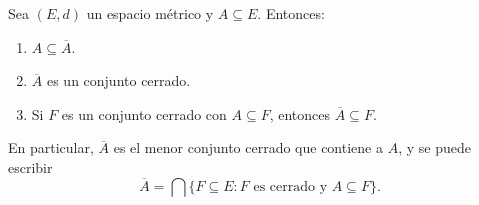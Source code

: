 \begin{prop}
Sea $(E,d)$ un espacio métrico y $A \subseteq E$.
Entonces:
\begin{enumerate}[label=(\roman*)]
    \item $A \subseteq \overline{A}$.
    \item $\overline{A}$ es un conjunto cerrado.
    \item Si $F$ es un conjunto cerrado con $A \subseteq F$, entonces
    $\overline{A} \subseteq F$.
\end{enumerate}
En particular, $\overline{A}$ es el menor conjunto cerrado que contiene a $A$,
y se puede escribir
\[
\overline{A} = \bigcap\{F \subseteq E : F \text{ es cerrado y } A \subseteq F\}.
\]
\end{prop}

